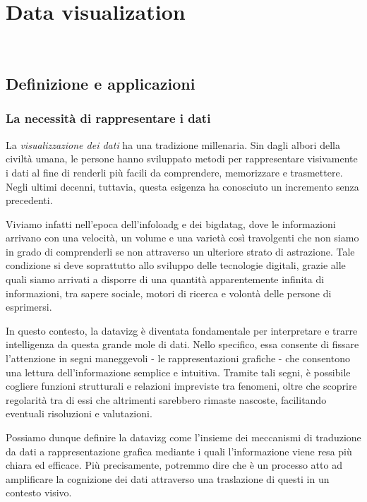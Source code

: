 \chapter{Data visualization}
\label{cap:studio_data_viz}
\\

\section{Definizione e applicazioni}
\subsection{La necessità di rappresentare i dati}
La \emph{visualizzazione dei dati} ha una tradizione millenaria. Sin dagli albori della civiltà umana, 
le persone hanno sviluppato metodi per rappresentare visivamente i dati al fine di renderli più facili da comprendere, 
memorizzare e trasmettere.
Negli ultimi decenni, tuttavia, questa esigenza ha conosciuto un incremento senza precedenti.

Viviamo infatti nell'epoca dell'\gls{infoloadg} e dei \gls{bigdatag}, dove le informazioni
arrivano con una velocità, un volume e una varietà così travolgenti che non siamo in grado di comprenderli se non attraverso
un ulteriore strato di astrazione.
Tale condizione si deve soprattutto allo sviluppo delle tecnologie digitali, grazie alle quali siamo arrivati a disporre di una quantità 
apparentemente infinita di informazioni, tra sapere sociale, motori di ricerca e volontà delle persone di esprimersi.

In questo contesto, la \gls{datavizg} è diventata fondamentale per interpretare e trarre intelligenza da questa grande mole di dati.
Nello specifico, essa consente di fissare l'attenzione in segni maneggevoli - le rappresentazioni grafiche - che consentono una lettura dell'informazione
semplice e intuitiva. Tramite tali segni, è possibile cogliere funzioni strutturali e relazioni impreviste tra fenomeni, oltre che scoprire regolarità tra di essi che 
altrimenti sarebbero rimaste nascoste, facilitando eventuali risoluzioni e valutazioni.

\bigskip
\noindent Possiamo dunque definire la \gls{datavizg} come l'insieme dei meccanismi di traduzione da dati a rappresentazione grafica
mediante i quali l'informazione viene resa più chiara ed efficace. Più precisamente, 
potremmo dire che è un processo atto ad amplificare la cognizione dei dati attraverso
una traslazione di questi in un contesto visivo.


